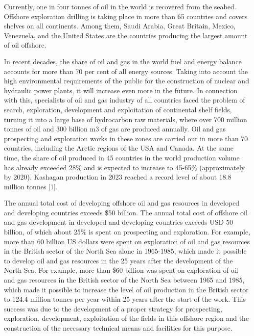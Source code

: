 Currently, one in four tonnes of oil in the world is recovered from the
seabed. Offshore exploration drilling is taking place in more than 65
countries and covers shelves on all continents. Among them, Saudi
Arabia, Great Britain, Mexico, Venezuela, and the United States are the
countries producing the largest amount of oil offshore.

In recent decades, the share of oil and gas in the world fuel and energy
balance accounts for more than 70 per cent of all energy sources. Taking
into account the high environmental requirements of the public for the
construction of nuclear and hydraulic power plants, it will increase
even more in the future. In connection with this, specialists of oil and
gas industry of all countries faced the problem of search, exploration,
development and exploitation of continental shelf fields, turning it
into a large base of hydrocarbon raw materials, where over 700 million
tonnes of oil and 300 billion m3 of gas are produced annually. Oil and
gas prospecting and exploration works in these zones are carried out in
more than 70 countries, including the Arctic regions of the USA and
Canada. At the same time, the share of oil produced in 45 countries in
the world production volume has already exceeded 28\% and is expected to
increase to 45-65\% (approximately by 2020). Kashagan production in 2023
reached a record level of about 18.8 million tonnes {[}1{]}.

The annual total cost of developing offshore oil and gas resources in
developed and developing countries exceeds \$50 billion. The annual
total cost of offshore oil and gas development in developed and
developing countries exceeds USD 50 billion, of which about 25\% is
spent on prospecting and exploration. For example, more than 60 billion
US dollars were spent on exploration of oil and gas resources in the
British sector of the North Sea alone in 1965-1985, which made it
possible to develop oil and gas resources in the 25 years after the
development of the North Sea. For example, more than \$60 billion was
spent on exploration of oil and gas resources in the British sector of
the North Sea between 1965 and 1985, which made it possible to increase
the level of oil production in the British sector to 124.4 million
tonnes per year within 25 years after the start of the work. This
success was due to the development of a proper strategy for prospecting,
exploration, development, exploitation of the fields in this offshore
region and the construction of the necessary technical means and
facilities for this purpose.


